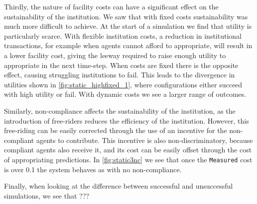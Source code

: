 Thirdly, the nature of facility costs can have a significant effect on the
sustainability of the institution. We saw that with fixed costs sustainability
was much more difficult to achieve. At the start of a simulation we find that
utility is particularly scarce. With flexible institution costs, a reduction
in institutional transactions, for example when agents cannot afford to
appropriate, will result in a lower facility cost, giving the leeway required
to raise enough utility to appropriate in the next time-step. When costs are
fixed there is the opposite effect, causing struggling institutions to fail.
This leads to the divergence in utilities shown in
\autoref{fig:static_highfixed_1}, where configurations either succeed with
high utility or fail. With dynamic costs we see a larger range of outcomes.

Similarly, non-compliance affects the sustainability of the institution, as
the introduction of free-riders reduces the efficiency of the institution.
However, this free-riding can be easily corrected through the use of an
incentive for the non-compliant agents to contribute. This incentive is also
non-discriminatory, because compliant agents also receive it, and its cost can
be easily offset through the cost of appropriating predictions. In
\autoref{fig:static3nc} we see that once the \texttt{Measured} cost is over
0.1 the system behaves as with no non-compliance.

Finally, when looking at the difference between successful and unsuccessful simulations, we see that ???




